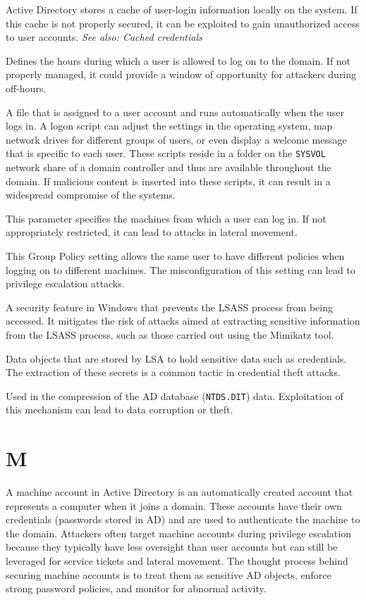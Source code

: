  Active Directory stores a cache of user-login information locally on the system. If this cache is not properly secured, it can be exploited to gain unauthorized access to user accounts.
\textit{See also: Cached credentials}

 Defines the hours during which a user is allowed to log on to the domain. If not properly managed, it could provide a window of opportunity for attackers during off-hours.

 A file that is assigned to a user account and runs automatically when the user logs in. A logon script can adjust the settings in the operating system, map network drives for different groups of users, or even display a welcome message that is specific to each user. These scripts reside in a folder on the \texttt{SYSVOL} network share of a domain controller and thus are available throughout the domain. If malicious content is inserted into these scripts, it can result in a widespread compromise of the systems.

 This parameter specifies the machines from which a user can log in. If not appropriately restricted, it can lead to attacks in lateral movement.

 This Group Policy setting allows the same user to have different policies when logging on to different machines. The misconfiguration of this setting can lead to privilege escalation attacks.

 A security feature in Windows that prevents the LSASS process from being accessed. It mitigates the risk of attacks aimed at extracting sensitive information from the LSASS process, such as those carried out using the Mimikatz tool.

 Data objects that are stored by LSA to hold sensitive data such as credentials. The extraction of these secrets is a common tactic in credential theft attacks.

 Used in the compression of the AD database (\texttt{NTDS.DIT}) data. Exploitation of this mechanism can lead to data corruption or theft.

\section*{M}
 A machine account in Active Directory is an automatically created account that represents a computer when it joins a domain. These accounts have their own credentials (passwords stored in AD) and are used to authenticate the machine to the domain. Attackers often target machine accounts during privilege escalation because they typically have less oversight than user accounts but can still be leveraged for service tickets and lateral movement. The thought process behind securing machine accounts is to treat them as sensitive AD objects, enforce strong password policies, and monitor for abnormal activity.

